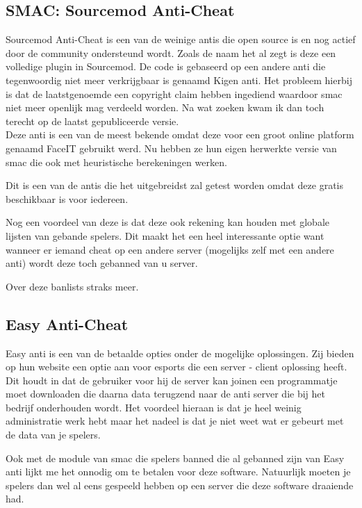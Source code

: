 \documentclass[pdftex,a4paper,12pt,twoside]{report}
\begin{document}
\subsection{SMAC: Sourcemod Anti-Cheat}
\label{sec:smac}

Sourcemod Anti-Cheat is een van de weinige \gls{anti}s die open source is en nog actief door de community ondersteund wordt. Zoals de naam het al zegt is deze een volledige plugin in Sourcemod. De code is gebaseerd op een andere \gls{anti} die tegenwoordig niet meer verkrijgbaar is genaamd Kigen \gls{anti}. Het probleem hierbij is dat de laatstgenoemde een copyright claim hebben ingediend waardoor \gls{smac} niet meer openlijk mag verdeeld worden. Na wat zoeken kwam ik dan toch terecht op de laatst gepubliceerde versie.\citep{smac}
\\

Deze \gls{anti} is een van de meest bekende omdat deze voor een groot online platform genaamd FaceIT gebruikt werd. Nu hebben ze hun eigen herwerkte versie van \gls{smac} die ook met heuristische berekeningen werken.

Dit is een van de \gls{anti}s die het uitgebreidst zal getest worden omdat deze gratis beschikbaar is voor iedereen.

Nog een voordeel van deze is dat deze ook rekening kan houden met globale lijsten van gebande spelers. Dit maakt het een heel interessante optie want wanneer er iemand \gls{cheat} op een andere server (mogelijks zelf met een andere \gls{anti}) wordt deze toch gebanned van u server.

Over deze banlists straks meer.

\subsection{Easy Anti-Cheat}
\label{sec:easy}
Easy \gls{anti} is een van de betaalde opties onder de mogelijke oplossingen. Zij bieden op hun website een optie aan voor \gls{esports} die een server - client oplossing heeft. Dit houdt in dat de gebruiker voor hij de server kan joinen een programmatje moet downloaden die daarna data terugzend naar de \gls{anti} server die bij het bedrijf onderhouden wordt. Het voordeel hieraan is dat je heel weinig administratie werk hebt maar het nadeel is dat je niet weet wat er gebeurt met de data van je spelers.

Ook met de module van \gls{smac} die spelers banned die al gebanned zijn van Easy \gls{anti} lijkt me het onnodig om te betalen voor deze software. Natuurlijk moeten je spelers dan wel al eens gespeeld hebben op een server die deze software draaiende had.\citep{eac}
\end{document}
